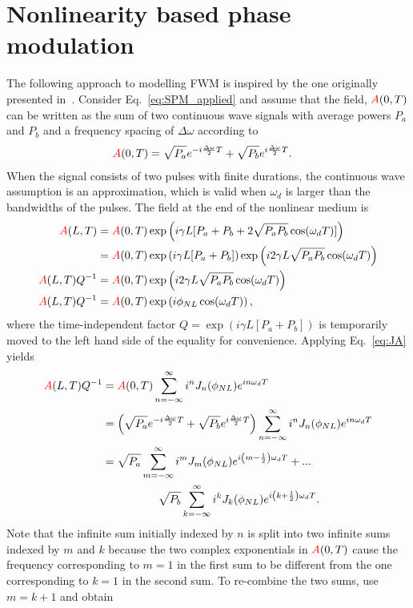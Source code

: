 \section{Nonlinearity based phase modulation}
\label{sec:sidebands}
The following approach to modelling FWM is inspired by the one originally presented in~\cite{Boskovic_Original_Kerr_Effect}. Consider Eq.~\ref{eq:SPM_applied} and assume that the field, $\textcolor{red}{A}(0,T)$ can be written as the sum of two continuous wave signals with average powers $P_a$ and $P_b$ and a frequency spacing of $\Delta\omega$ according to
\begin{align}
    \label{eq:FWM_input}
    \textcolor{red}{A}(0,T)&= \sqrt{P_a}e^{-i\frac{\Delta\omega}{2}T}+\sqrt{P_b}e^{i\frac{\Delta\omega}{2}T}.
\end{align}
When the signal consists of two pulses with finite durations, the continuous wave assumption is an approximation, which is valid when $\omega_d$ is larger than the bandwidths of the pulses. The field at the end of the nonlinear medium is
\begin{align}
    \textcolor{red}{A}(L,T) &= \textcolor{red}{A}(0,T)\exp\left(i\gamma L [P_a+P_b+2\sqrt{P_aP_b}\cos(\omega_dT)] \right) \\ \nonumber
    &= \textcolor{red}{A}(0,T)\exp\left(i\gamma L [P_a+P_b]\right)\exp\left(i2\gamma L\sqrt{P_aP_b}\cos(\omega_dT) \right)\\ \nonumber
    \textcolor{red}{A}(L,T)Q^{-1}&= \textcolor{red}{A}(0,T)\exp\left(i2\gamma L\sqrt{P_aP_b}\cos(\omega_dT) \right)\\ \nonumber
    \textcolor{red}{A}(L,T)Q^{-1}&= \textcolor{red}{A}(0,T)\exp\left(i\phi_{NL}\cos(\omega_dT) \right),
\end{align}
where the time-independent factor $Q=\exp(i\gamma L [P_a+P_b])$ is temporarily moved to the left hand side of the equality for convenience. Applying Eq.~\ref{eq:JA} yields
\begin{align}
    \textcolor{red}{A}(L,T)Q^{-1}&= \textcolor{red}{A}(0,T)\sum_{n=-\infty}^{\infty}i^nJ_n(\phi_{NL})e^{in\omega_dT} \\ \nonumber
    &=\left(\sqrt{P_a}e^{-i\frac{\Delta\omega}{2}T}+\sqrt{P_b}e^{i\frac{\Delta\omega}{2}T}\right)\sum_{n=-\infty}^{\infty}i^nJ_n(\phi_{NL})e^{in\omega_dT} \\ \nonumber
    &=\sqrt{P_a}\sum_{m=-\infty}^{\infty}i^mJ_m(\phi_{NL})e^{i\left(m-\frac{1}{2}\right)\omega_dT}+...\\ \nonumber & \quad\quad\quad\quad\quad\sqrt{P_b}\sum_{k=-\infty}^{\infty}i^kJ_k(\phi_{NL})e^{i\left(k+\frac{1}{2}\right)\omega_dT}.
\end{align}
Note that the infinite sum initially indexed by $n$ is split into two infinite sums indexed by $m$ and $k$ because the two complex exponentials in $\textcolor{red}{A}(0,T)$ cause the frequency corresponding to $m=1$ in the first sum to be different from the one corresponding to $k=1$ in the second sum. To re-combine the two sums, use $m=k+1$ and obtain
